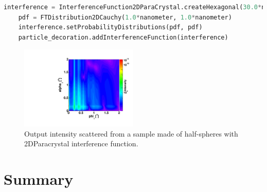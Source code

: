 \begin{lstlisting}[language=python, style=eclipseboxed,numbers=none,nolol,caption={\Code{Python} script to define a "2DParacrystal" interference function between particles forming an hexagonal monolayer. },label={lst:2dlatticeinterf}]
    interference = InterferenceFunction2DParaCrystal.createHexagonal(30.0*nanometer,0.0, 40.0*micrometer, 40.0*micrometer)|
    pdf = FTDistribution2DCauchy(1.0*nanometer, 1.0*nanometer)
    interference.setProbabilityDistributions(pdf, pdf)
    particle_decoration.addInterferenceFunction(interference)
\end{lstlisting}

\begin{figure}[ht]
\begin{center}
\includegraphics[width=0.5\textwidth]{Figures/HSphere_2DDL}
\end{center}
\caption{Output intensity scattered from a sample made of half-spheres with 2DParacrystal interference function.}
\label{fig:2ddl}
\end{figure}

\FloatBarrier

\section{Summary}

